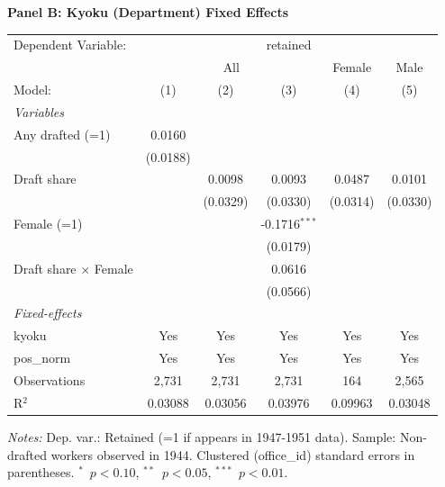 \begin{table}[htbp]
\begin{threeparttable}
\begin{tabular}{lccccc}
\end{tabular}
\par\endgroup
\vspace{2ex}
\textbf{Panel B: Kyoku (Department) Fixed Effects}\\[1ex]
\begingroup
\centering
\begin{tabular}{lccccc}
   \tabularnewline \midrule \midrule
   Dependent Variable: & \multicolumn{5}{c}{retained}\\
    & \multicolumn{3}{c}{All} & Female & Male \\ 
   Model:                       & (1)      & (2)      & (3)             & (4)      & (5)\\  
   \midrule
   \emph{Variables}\\
   Any drafted (=1)             & 0.0160   &          &                 &          &   \\   
                                & (0.0188) &          &                 &          &   \\   
   Draft share                  &          & 0.0098   & 0.0093          & 0.0487   & 0.0101\\   
                                &          & (0.0329) & (0.0330)        & (0.0314) & (0.0330)\\   
   Female (=1)                  &          &          & -0.1716$^{***}$ &          &   \\   
                                &          &          & (0.0179)        &          &   \\   
   Draft share $\times$ Female  &          &          & 0.0616          &          &   \\   
                                &          &          & (0.0566)        &          &   \\   
   \midrule
   \emph{Fixed-effects}\\
   kyoku                        & Yes      & Yes      & Yes             & Yes      & Yes\\  
   pos\_norm                    & Yes      & Yes      & Yes             & Yes      & Yes\\  
   \midrule
   Observations                 & 2,731    & 2,731    & 2,731           & 164      & 2,565\\  
   R$^2$                        & 0.03088  & 0.03056  & 0.03976         & 0.09963  & 0.03048\\  
   \midrule \midrule
\end{tabular}
\par\endgroup
\begin{tablenotes}[flushleft]
\footnotesize
\item \textit{Notes:} Dep. var.: Retained (=1 if appears in 1947-1951 data). Sample: Non-drafted workers observed in 1944. Clustered (office\_id) standard errors in parentheses. $^{*}$~$p<0.10$, $^{**}$~$p<0.05$, $^{***}$~$p<0.01$.
\end{tablenotes}
\end{threeparttable}
\end{table}
